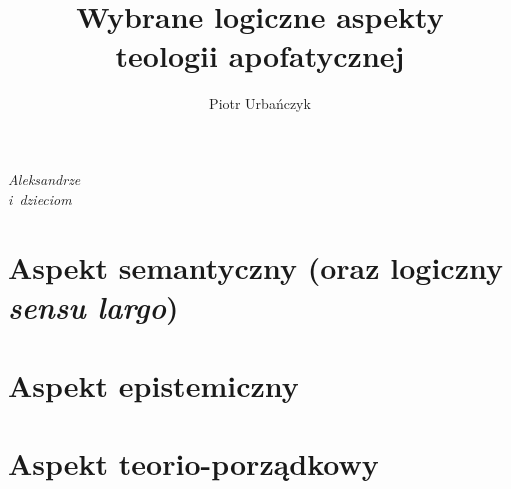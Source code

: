 \documentclass[12pt,a4paper,openany,oneside,leqno,titlepage]{report}
\title{Wybrane logiczne aspekty\\teologii apofatycznej}
\author{Piotr Urbańczyk}
\theoremstyle{definition}
\begin{document}



\stronatytulowa

\thispagestyle{empty}
\vspace*{19cm}
\begin{flushright}
\textit{Aleksandrze\\i~dzieciom}
\end{flushright}
\newpage


\stronanumerdwa


\tableofcontents

\cleardoublepage





\part{Aspekt semantyczny (oraz logiczny \textit{sensu largo})}





\part{Aspekt epistemiczny}



\part{Aspekt teorio-porządkowy}


\end{document}
